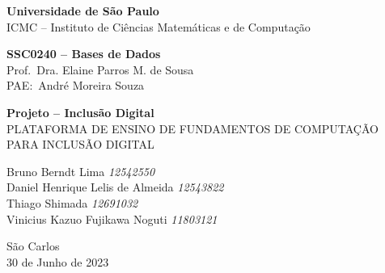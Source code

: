 \begin{capa}
    \begin{center}

        \vspace{1cm}

        {\Large\textbf{Universidade de São Paulo}} \\
        {\Large ICMC -- Instituto de Ciências Matemáticas e de Computação}\\

        \vspace{3cm}

        {
            \large
            \textbf{SSC0240 -- Bases de Dados} \\
            Prof.\ Dra. Elaine Parros M. de Sousa \\
            PAE:\ André Moreira Souza
        }

        \vspace{3cm}

        {\Large \textbf{Projeto -- Inclusão Digital}}\\
        {\large \uppercase{Plataforma de ensino de fundamentos de computação para inclusão digital}}\\

        \vspace{3cm}

        \begin{flushright}
            {
            {Bruno Berndt Lima \; \textit{12542550}} \\
            {Daniel Henrique Lelis de Almeida \; \textit{12543822}} \\
            {Thiago Shimada \; \textit{12691032}} \\
            {Vinicius Kazuo Fujikawa Noguti \; \textit{11803121}}
            }
        \end{flushright}

        \vfill

        {
            \large
            São Carlos \\
            30 de Junho de 2023
        }

    \end{center}
\end{capa}
